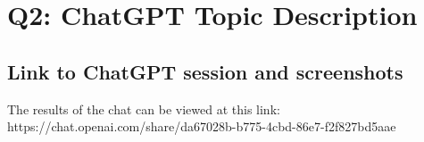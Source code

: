 \documentclass[12pt]{article}
\begin{document}
%



\section{Q2: ChatGPT Topic Description}
\subsection{Link to ChatGPT session and screenshots}
The results of the chat can be viewed at this link:
https://chat.openai.com/share/da67028b-b775-4cbd-86e7-f2f827bd5aae
\end{document}
